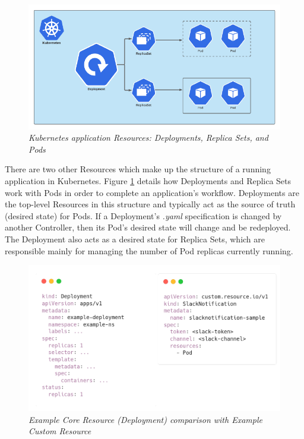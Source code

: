 \documentclass{article}
\begin{document}
\begin{figure}[H]
    \centering
    \includegraphics[width=160mm]{tech/resource-struct.png}
    \caption{\emph{Kubernetes application Resources: Deployments, Replica Sets, and Pods}}
    \label{resource-struct}
\end{figure}

There are two other Resources which make up the structure of a running application in Kubernetes. Figure \ref{resource-struct} \cite{k8s-rolling} details how Deployments and Replica Sets work with Pods in order to complete an application's workflow. Deployments are the top-level Resources in this structure and typically act as the source of truth (desired state) for Pods. If a Deployment's \emph{.yaml} specification is changed by another Controller, then its Pod's desired state will change and be redeployed. The Deployment also acts as a desired state for Replica Sets, which are responsible mainly for managing the number of Pod replicas currently running. 

\begin{figure}[H]
    \centering
    \includegraphics[width=125mm]{tech/core-cr.png}
    \caption{\emph{Example Core Resource (Deployment) comparison with Example Custom Resource}}
    \label{core-cr}
\end{figure}
\end{document}
